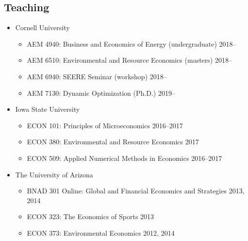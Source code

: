 \documentclass{res} %
\begin{document}
\begin{resume}
\vspace{-.075in}

\section{Teaching}
\begin{itemize}
	\item[] Cornell University
	\vspace{-0.05in}
	\begin{itemize} \itemsep -1pt
		\item[] AEM 4940: Business and Economics of Energy (undergraduate) \hfill 2018--
		\item[] AEM 6510: Environmental and Resource Economics (masters) \hfill 2018--
		\item[] AEM 6940: SEERE Seminar (workshop) \hfill 2018--
		\item[] AEM 7130: Dynamic Optimization (Ph.D.) \hfill 2019--	
	\end{itemize}
	\item[] Iowa State University
	\vspace{-0.05in}
	\begin{itemize} \itemsep -1pt
		\item[] ECON 101: Principles of Microeconomics \hfill 2016--2017
		\item[] ECON 380: Environmental and Resource Economics \hfill 2017
		\item[] ECON 509: Applied Numerical Methods in Economics \hfill 2016--2017
	\end{itemize}
	\item[] The University of Arizona
	\vspace{-0.05in}
	\begin{itemize} \itemsep -1pt %
		\item[] BNAD 301 Online: Global and Financial Economics and Strategies \hfill 2013, 2014
		\item[] ECON 323: The Economics of Sports \hfill 2013
		\item[] ECON 373: Environmental Economics \hfill 2012, 2014
	\end{itemize}
\end{itemize}
\vspace{-.075in}


\end{resume}
\end{document}

